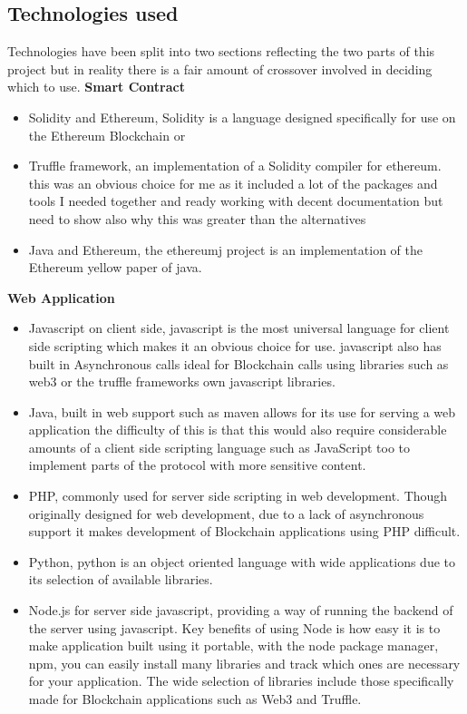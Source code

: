 \documentclass{entcs}
\begin{document}
\subsection{Technologies used}
Technologies have been split into two sections reflecting the two parts of this project but in reality there is a fair amount of crossover involved in deciding which to use.
\textbf{Smart Contract}
\begin{itemize}
    \item Solidity and Ethereum, Solidity is a language designed specifically for use on the Ethereum Blockchain or 
    \item Truffle framework, an implementation of a Solidity compiler for ethereum. this was an obvious choice for me as it included a lot of the packages and tools I needed together and ready working with decent documentation but need to show also why this was greater than the alternatives
    \item Java and Ethereum, the ethereumj project is an implementation of the Ethereum yellow paper of java. 
\end{itemize}

\textbf{Web Application}
\begin{itemize}
    \item Javascript on client side, javascript is the most universal language for client side scripting which makes it an obvious choice for use. javascript also has built in Asynchronous calls ideal for Blockchain calls using libraries such as web3 or the truffle frameworks own javascript libraries. 
    \item Java, built in web support such as maven allows for its use for serving a web application the difficulty of this is that this would also require considerable amounts of a client side scripting language such as JavaScript too to implement parts of the protocol with more sensitive content. 
    \item PHP, commonly used for server side scripting in web development. Though originally designed for web development, due to a lack of asynchronous support it makes development of Blockchain applications using PHP difficult.
    \item Python, python is an object oriented language with wide applications due to its selection of available libraries.
    \item Node.js for server side javascript, providing a way of running the backend of the server using javascript. Key benefits of using Node is how easy it is to make application built using it portable, with the node package manager, npm, you can easily install many libraries and track which ones are necessary for your application. The wide selection of libraries include those specifically made for Blockchain applications such as Web3 and Truffle.
\end{itemize}
\end{document}
